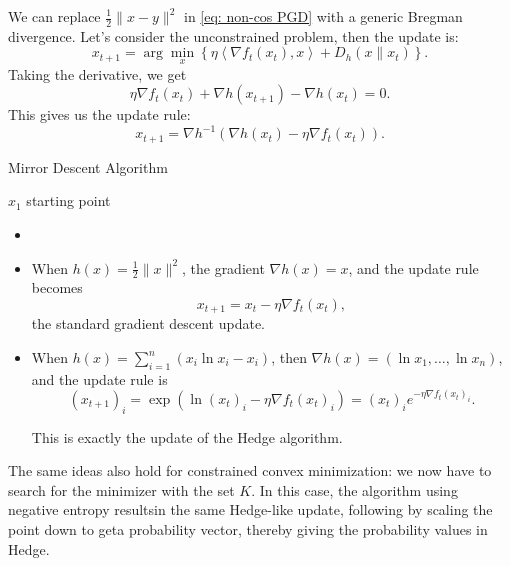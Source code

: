 We can replace $\frac{1}{2}\|x-y\|^2$ in \eqref{eq: non-cos PGD} with a generic Bregman divergence. Let's consider the unconstrained problem, then the update is:
$$
x_{t+1}=\arg \min _x\left\{\eta\left\langle\nabla f_t\left(x_t\right), x\right\rangle+D_h\left(x \| x_t\right)\right\} .
$$
Taking the derivative, we get
$$
\eta \nabla f_t\left(x_t\right)+\nabla h\left(x_{t+1}\right)-\nabla h\left(x_t\right)=0 .
$$
This gives us the update rule:
\begin{equation}
\label{eq: MD update rule}
    x_{t+1}=\nabla h^{-1}\left(\nabla h\left(x_t\right)-\eta \nabla f_t\left(x_t\right)\right) .
\end{equation}

\begin{algorithm}[H]
    \caption{Mirror Descent Algorithm}
    \label{MD algo}
    $x_1$ starting point \;
\end{algorithm}
    
    \begin{example}
    \label{eg: Examples of mirror descent}
    \begin{itemize}
        \item []
        \item When $h(x)=\frac{1}{2}\|x\|^2$, the gradient $\nabla h(x)=x$, and the update rule becomes
        $$
        x_{t+1}=x_t-\eta \nabla f_t\left(x_t\right),
        $$
        the standard gradient descent update.
        \item When $h(x)=\sum_{i=1}^n\left(x_i \ln x_i-x_i\right)$, then $\nabla h(x)=\left(\ln x_1, \ldots, \ln x_n\right)$, and the update rule is
        $$
        \left(x_{t+1}\right)_i=\exp \left(\ln \left(x_t\right)_i-\eta \nabla f_t\left(x_t\right)_i\right)=\left(x_t\right)_i e^{-\eta \nabla f_t\left(x_t\right)_i} .
        $$
        
        This is exactly the update of the Hedge algorithm.
    \end{itemize}
    \end{example}

    The same ideas also hold for constrained convex minimization: we now have to search for the minimizer with the set $K$. In this case, the algorithm using negative entropy resultsin the same Hedge-like update, following by scaling the point down to geta probability vector, thereby giving the probability values in Hedge.


